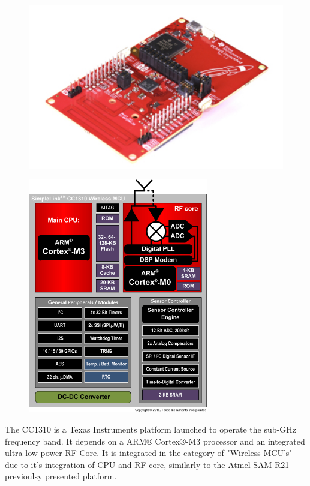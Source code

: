 \vspace{-1.5em}
\begin{figure}[h!]
	\centering
	\begin{minipage}{.5\textwidth}
		\centering
		\vspace{2.5em}
		\includegraphics[width=1\textwidth,keepaspectratio]{figures/cc1310_board}
		\vspace{2em}
		\label{fig:test1}
	\end{minipage}%
	\begin{minipage}{.5\textwidth}
		\centering
		\includegraphics[width=0.70\textwidth,keepaspectratio]{figures/cc1310}
		\label{fig:test2}
	\end{minipage}
\end{figure}
The CC1310 is a Texas Instruments platform launched to operate the sub-GHz frequency band. It depends on a ARM® Cortex®-M3 processor and an integrated ultra-low-power RF Core. It is integrated in the category of "Wireless MCU's" due to it's integration of CPU and RF core, similarly to the Atmel SAM-R21 previoulsy presented platform.


